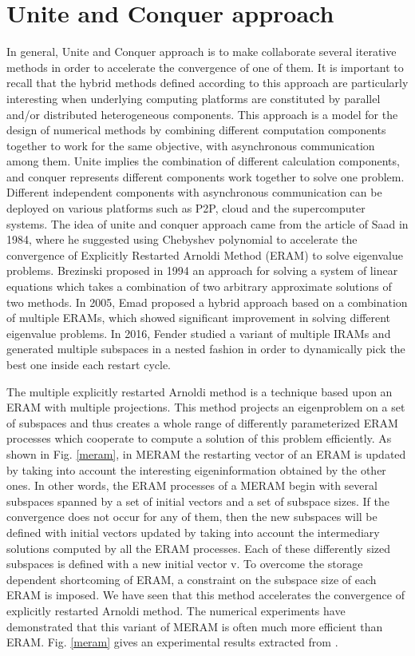 \vspace{1in}
\section{Unite and Conquer approach}

In general, Unite and Conquer approach is to make collaborate several iterative methods in order to accelerate the convergence of one of them. It is important to recall that the hybrid methods defined according to this approach are particularly interesting when underlying computing platforms are constituted by parallel and/or distributed heterogeneous components. This approach is a model for the design of numerical methods by combining different computation components together to work for the same objective, with asynchronous communication among them. Unite implies the combination of different calculation components, and conquer represents different components work together to solve one problem. Different independent components with asynchronous communication can be deployed on various platforms such as P2P, cloud and the supercomputer systems. The idea of unite and conquer approach came from the article of Saad \cite{saad1984chebyshev} in 1984, where he suggested using Chebyshev polynomial to accelerate the convergence of Explicitly Restarted Arnoldi Method (ERAM) to solve eigenvalue problems. Brezinski \cite{brezinski1994hybrid} proposed in 1994 an approach for solving a system of linear equations which takes a combination of two arbitrary approximate solutions of two methods. In 2005, Emad \cite{emad2005multiple} proposed a hybrid approach based on a combination of multiple ERAMs, which showed significant improvement in solving different eigenvalue problems. In 2016, Fender \cite{fender2016leveraging} studied a variant of multiple IRAMs and generated multiple subspaces in a nested fashion in order to dynamically pick the best one inside each restart cycle.

The multiple explicitly restarted Arnoldi method is a technique based upon an ERAM with multiple projections.
This method projects an eigenproblem on a set of subspaces and thus creates a whole range of differently parameterized ERAM processes which cooperate to compute a solution of this problem efficiently. As shown in Fig. \ref{meram}, in MERAM the restarting vector of an ERAM is updated by taking into account the interesting eigeninformation obtained by the other ones. In other words, the ERAM processes of a MERAM begin with several subspaces spanned by a set of initial vectors and a set of subspace sizes. If the convergence does not occur for any of them, then the new subspaces will be defined with initial vectors updated by taking into account the intermediary solutions computed by all the ERAM processes. Each of these differently sized subspaces is defined with a new initial vector v. To overcome the storage dependent shortcoming of ERAM, a constraint on the subspace size of each ERAM is imposed. We have seen that this method accelerates the convergence of explicitly restarted Arnoldi method. The numerical experiments have demonstrated that this variant of MERAM is often much more efficient than ERAM. Fig. \ref{meram} gives an experimental results extracted from \cite{emad2005multiple}.

